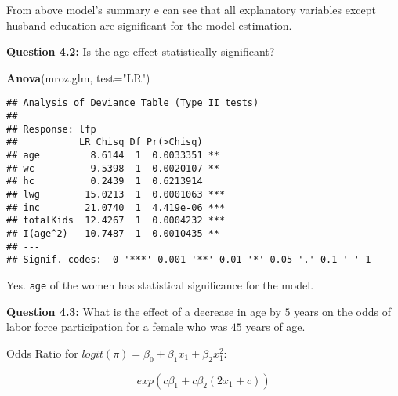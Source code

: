 \documentclass[]{article}
\newenvironment{Shaded}{\begin{snugshade}}{\end{snugshade}}
\newcommand{\DataTypeTok}[1]{\textcolor[rgb]{0.13,0.29,0.53}{#1}}
\newcommand{\DecValTok}[1]{\textcolor[rgb]{0.00,0.00,0.81}{#1}}
\newcommand{\KeywordTok}[1]{\textcolor[rgb]{0.13,0.29,0.53}{\textbf{#1}}}
\newcommand{\NormalTok}[1]{#1}
\newcommand{\OperatorTok}[1]{\textcolor[rgb]{0.81,0.36,0.00}{\textbf{#1}}}
\newcommand{\StringTok}[1]{\textcolor[rgb]{0.31,0.60,0.02}{#1}}
\begin{document}
From above model's summary e can see that all explanatory variables
except husband education are significant for the model estimation.

\textbf{Question 4.2:} Is the age effect statistically significant?

\begin{Shaded}
\begin{Highlighting}[]
\KeywordTok{Anova}\NormalTok{(mroz.glm, }\DataTypeTok{test=}\StringTok{"LR"}\NormalTok{)}
\end{Highlighting}
\end{Shaded}

\begin{verbatim}
## Analysis of Deviance Table (Type II tests)
## 
## Response: lfp
##           LR Chisq Df Pr(>Chisq)    
## age         8.6144  1  0.0033351 ** 
## wc          9.5398  1  0.0020107 ** 
## hc          0.2439  1  0.6213914    
## lwg        15.0213  1  0.0001063 ***
## inc        21.0740  1  4.419e-06 ***
## totalKids  12.4267  1  0.0004232 ***
## I(age^2)   10.7487  1  0.0010435 ** 
## ---
## Signif. codes:  0 '***' 0.001 '**' 0.01 '*' 0.05 '.' 0.1 ' ' 1
\end{verbatim}

Yes. \texttt{age} of the women has statistical significance for the
model.

\textbf{Question 4.3:} What is the effect of a decrease in age by \(5\)
years on the odds of labor force participation for a female who was
\(45\) years of age.

Odds Ratio for \(logit(\pi) = \beta_0 + \beta_1x_1 + \beta_2x_1^2:\)

\[
exp(c\beta_1+c\beta_2(2x_1+c))
\]

\begin{Shaded}
\end{Shaded}
\end{document}

